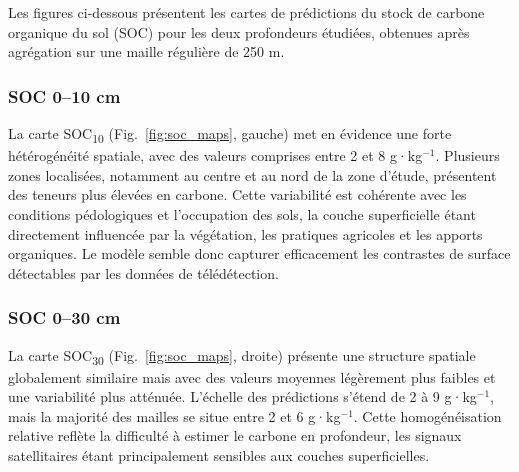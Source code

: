 \documentclass[12pt,a4paper,oneside]{report}
\begin{document}
Les figures ci-dessous présentent les cartes de prédictions du stock de carbone organique du sol (SOC) pour les deux profondeurs étudiées, obtenues après agrégation sur une maille régulière de 250 m.

\subsubsection*{SOC 0--10 cm}
La carte SOC\textsubscript{10} (Fig.~\ref{fig:soc_maps}, gauche) met en évidence une forte hétérogénéité spatiale, avec des valeurs comprises entre 2 et 8 g·kg\(^{-1}\). Plusieurs zones localisées, notamment au centre et au nord de la zone d’étude, présentent des teneurs plus élevées en carbone.  
Cette variabilité est cohérente avec les conditions pédologiques et l’occupation des sols, la couche superficielle étant directement influencée par la végétation, les pratiques agricoles et les apports organiques.  
Le modèle semble donc capturer efficacement les contrastes de surface détectables par les données de télédétection.

\subsubsection*{SOC 0--30 cm}
La carte SOC\textsubscript{30} (Fig.~\ref{fig:soc_maps}, droite) présente une structure spatiale globalement similaire mais avec des valeurs moyennes légèrement plus faibles et une variabilité plus atténuée.  
L’échelle des prédictions s’étend de 2 à 9 g·kg\(^{-1}\), mais la majorité des mailles se situe entre 2 et 6 g·kg\(^{-1}\).  
Cette homogénéisation relative reflète la difficulté à estimer le carbone en profondeur, les signaux satellitaires étant principalement sensibles aux couches superficielles.
\end{document}

